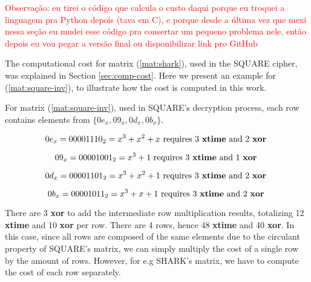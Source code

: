 
\textcolor{red}{Observação: eu tirei o código que calcula o custo daqui porque eu troquei a linguagem pra Python depois (tava em C), e porque desde a última vez que mexi nessa seção eu mudei esse código pra consertar um pequeno problema nele, então depois eu vou pegar a versão final ou disponibilizar link pro GitHub}

The computational cost for matrix (\ref{mat:shark}), used in the SQUARE cipher, was explained in Section \ref{sec:comp-cost}. Here we present an example for (\ref{mat:square-inv}), to illustrate how the cost is computed in this work.

For matrix (\ref{mat:square-inv}), used in SQUARE's decryption process, each row contains elements from $\{0e_x, 09_x, 0d_x, 0b_x\}$.

\begin{equation*}
0e_x = 00001110_2 = x^3 + x^2 + x \text{ requires 3 \textbf{xtime} and 2 \textbf{xor} }
\end{equation*}

\begin{equation*}
09_x = 00001001_2 = x^3 + 1 \text{ requires 3 \textbf{xtime} and 1 \textbf{xor} }
\end{equation*}

\begin{equation*}
0d_x = 00001101_2 = x^3 + x^2 + 1 \text{ requires 3 \textbf{xtime} and 2 \textbf{xor} }
\end{equation*}

\begin{equation*}
0b_x = 00001011_2 = x^3 + x + 1 \text{ requires 3 \textbf{xtime} and 2 \textbf{xor} }
\end{equation*}

There are 3 \textbf{xor} to add the intermediate row multiplication results, totalizing 12 \textbf{xtime} and 10 \textbf{xor} per row. There are 4 rows, hence 48 \textbf{xtime} and 40 \textbf{xor}. In this case, since all rows are composed of the same elements due to the circulant property of SQUARE's matrix, we can simply multiply the cost of a single row by the amount of rows. However, for e.g SHARK's matrix, we have to compute the cost of each row separately.
